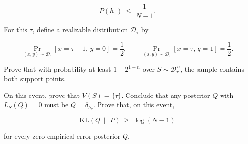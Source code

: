 \documentclass[11pt]{article}
\begin{document}
\[
P(h_\tau) \;\le\; \frac{1}{N-1}.
\]



For this $\tau$, define a realizable distribution $\mathcal{D}_\tau$ by


\[
\Pr_{(x,y)\sim \mathcal{D}_\tau}[x = \tau - 1,\, y = 0] = \frac{1}{2},
\qquad
\Pr_{(x,y)\sim \mathcal{D}_\tau}[x = \tau,\, y = 1] = \frac{1}{2}.
\]



Prove that with probability at least $1 - 2^{1-n}$ over $S \sim \mathcal{D}_\tau^{\,n}$, 
the sample contains both support points.

On this event, prove that $V(S) = \{\tau\}$. Conclude that any posterior $Q$ with 
$L_S(Q) = 0$ must be $Q = \delta_{h_\tau}$. Prove that, on this event,


\[
\mathrm{KL}(Q \,\|\, P) \;\ge\; \log(N-1)
\]


for every zero-empirical-error posterior $Q$.
\end{document}
